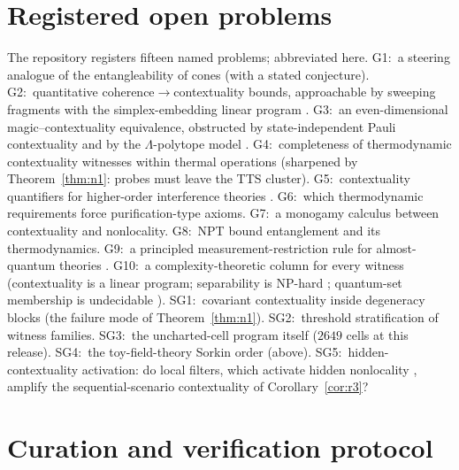 \documentclass[11pt,a4paper]{article}
\theoremstyle{definition}
\begin{document}
\section{Registered open problems}\label{sec:open}

The repository registers fifteen named problems; abbreviated here. G1:~a
steering analogue of the entangleability of cones (with a stated conjecture).
G2:~quantitative coherence$\to$contextuality bounds, approachable by sweeping
fragments with the simplex-embedding linear program \cite{selby2022lp}.
G3:~an even-dimensional magic--contextuality equivalence, obstructed by
state-independent Pauli contextuality and by the $\Lambda$-polytope model
\cite{zurel2020}. G4:~completeness of thermodynamic contextuality witnesses
within thermal operations (sharpened by Theorem~\ref{thm:n1}: probes must
leave the TTS cluster). G5:~contextuality quantifiers for higher-order
interference theories \cite{dakic2014}. G6:~which thermodynamic requirements
force purification-type axioms. G7:~a monogamy calculus between contextuality
and nonlocality. G8:~NPT bound entanglement and its thermodynamics.
G9:~a principled measurement-restriction rule for almost-quantum theories
\cite{navascues2015,sainz2018}. G10:~a complexity-theoretic column for every
witness (contextuality is a linear program; separability is NP-hard
\cite{gurvits2003}; quantum-set membership is undecidable \cite{jnvwy2020}).
SG1:~covariant contextuality inside degeneracy blocks (the failure mode of
Theorem~\ref{thm:n1}). SG2:~threshold stratification of witness families.
SG3:~the uncharted-cell program itself ($2649$ cells at this release).
SG4:~the toy-field-theory Sorkin order (above). SG5:~hidden-contextuality
activation: do local filters, which activate hidden nonlocality
\cite{werner1989,barrett2002}, amplify the sequential-scenario contextuality
of Corollary~\ref{cor:r3}?

\section{Curation and verification protocol}\label{sec:protocol}
\end{document}
